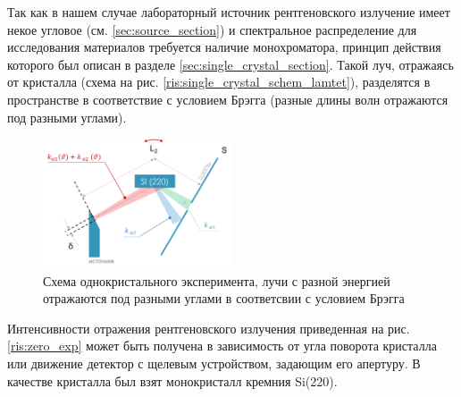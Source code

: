 Так как в нашем случае лабораторный источник рентгеновского излучение имеет
некое угловое  (см. \ref{sec:source_section}) и спектральное распределение
для исследования материалов требуется наличие монохроматора, принцип действия которого
был описан в разделе \ref{sec:single_crystal_section}. Такой луч, отражаясь от
кристалла (схема на рис. \ref{ris:single_crystal_schem_lamtet}), разделятся в пространстве
в соответствие с условием Брэгга (разные длины волн отражаются под разными углами).

\begin{figure}[H]
  \centering
  \includegraphics[width=0.5\textwidth]{images/single_crystal_schem_exp.png}
  \caption{Схема однокристального эксперимента, лучи с разной энергией отражаются под разными углами
  в соответсвии с условием Брэгга}
  \label{ris:single_crystal_schem_exp}
\end{figure}

Интенсивности отражения рентгеновского излучения приведенная на рис. \ref{ris:zero_exp} может быть
получена в зависимость от угла поворота кристалла или движение детектор с щелевым устройством,
задающим его апертуру. В качестве кристалла был взят монокристалл кремния Si(220).


